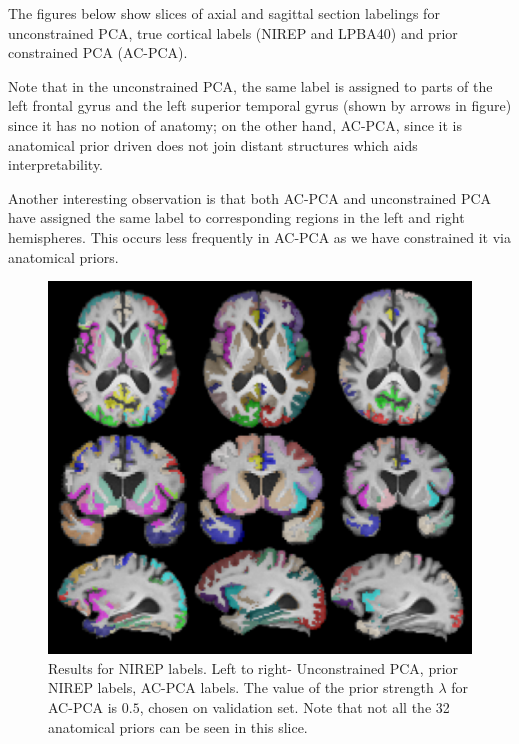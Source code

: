 \documentclass{article}
\begin{document}
The figures below show slices of axial and sagittal section labelings for unconstrained PCA, true cortical labels (NIREP and LPBA40) and prior constrained PCA (AC-PCA).


Note that in the unconstrained PCA, the same label is assigned to parts of the left frontal gyrus and the left superior temporal gyrus (shown by arrows in figure) since it has no notion of anatomy; on the other hand, AC-PCA, since it is anatomical prior driven does not join distant structures which aids interpretability.

Another interesting observation is that both AC-PCA and unconstrained PCA have assigned  the same label to corresponding regions in the left and right hemispheres. This occurs less frequently in AC-PCA as we have constrained it via anatomical priors.  %


\begin{figure}
\begin{center}
\includegraphics[width=0.7\linewidth]{nirep.pdf} 
\end{center}
\vspace{-0.2in}
\caption{Results for NIREP labels. Left to right- Unconstrained PCA, prior NIREP labels, AC-PCA labels. The value of the prior strength $\lambda$ for AC-PCA is $0.5$, chosen on validation set. Note that not all the 32 anatomical priors can be seen in this slice.}
\label{fig:priornirep}
\end{figure}
\end{document}
